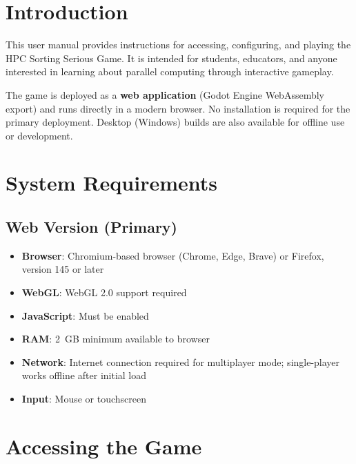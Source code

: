 
\section{Introduction}
\label{app:a:introduction}

This user manual provides instructions for accessing, configuring, and playing the HPC Sorting Serious Game. It is intended for students, educators, and anyone interested in learning about parallel computing through interactive gameplay.

The game is deployed as a \textbf{web application} (Godot Engine WebAssembly export) and runs directly in a modern browser. No installation is required for the primary deployment. Desktop (Windows) builds are also available for offline use or development.

\section{System Requirements}
\label{app:a:system-requirements}

\subsection{Web Version (Primary)}

\begin{itemize}
    \item \textbf{Browser}: Chromium-based browser (Chrome, Edge, Brave) or Firefox, version 145 or later
    \item \textbf{WebGL}: WebGL 2.0 support required
    \item \textbf{JavaScript}: Must be enabled
    \item \textbf{RAM}: 2~GB minimum available to browser
    \item \textbf{Network}: Internet connection required for multiplayer mode; single-player works offline after initial load
    \item \textbf{Input}: Mouse or touchscreen
\end{itemize}

\section{Accessing the Game}
\label{app:a:accessing}

